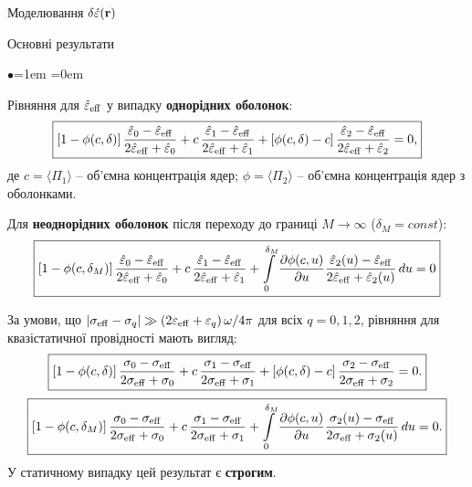 \documentclass[10pt]{beamer}
\begin{document}
\begin{frame}{Моделювання $\delta\hat{\varepsilon}({\bf r})$}
\end{frame}

\begin{frame}{Основні результати}
\footnotesize

\begin{list}{$\bullet$}{\leftmargin=1em \itemindent=0em}
\item
Рівняння для $\hat{\varepsilon}_{\rm eff}$ у випадку \textbf{однорідних оболонок}:
\begin{equation}\label{eq:uniformshell}
\boxed{
\left[1-\phi(c, \delta)\right]\frac{\hat{\varepsilon}_0
-\hat{\varepsilon}_{\rm eff}}{2\hat{\varepsilon}_{\rm
eff}+\hat{\varepsilon}_0} + c\,\frac{\hat{\varepsilon}_1
-\hat{\varepsilon}_{\rm eff}}{2\hat{\varepsilon}_{\rm
eff}+\hat{\varepsilon}_1}
+\left[\phi(c, \delta)-c\right]\frac{\hat{\varepsilon}_2
-\hat{\varepsilon}_{\rm eff}}{2\hat{\varepsilon}_{\rm
eff}+\hat{\varepsilon}_2}=0, 
}
\end{equation}
де $c = \langle \Pi_1 \rangle$ -- об'ємна концентрація ядер; $\phi = \langle \Pi_2 \rangle$ -- об'ємна концентрація ядер з оболонками. 

\item
Для \textbf{неоднорідних оболонок} після переходу до границі $M \to \infty$ ($\delta_M = const$):
\begin{equation}\label{eq:nonuniformshell}
\boxed{
\left[1-\phi(c, \delta_M)\right]\frac{\hat{\varepsilon}_0
-\hat{\varepsilon}_{\rm eff}}{2\hat{\varepsilon} _{\rm
eff}+\hat{\varepsilon}_0}+ c\,\frac{\hat{\varepsilon}_1
-\hat{\varepsilon}_{\rm eff}}{2\hat{\varepsilon}_{\rm
eff}+\hat{\varepsilon}_1}
+\int\limits_0^{\delta_M}\frac{\partial \phi(c,u)}{\partial
u}\frac{\hat{\varepsilon}_2 (u) -\hat{\varepsilon}_{\rm
eff}}{2\hat{\varepsilon}_{\rm eff}+\hat{\varepsilon}_2 (u)}\,du
=0
}
\end{equation}

\item
За умови, що  $|\sigma_{\rm eff}-\sigma_{ q}|  \gg  
\left(2\varepsilon_{\rm eff} +\varepsilon_q \right) \omega/4\pi$ для всіх $q=0,1,2$,  рівняння для квазістатичної провідності мають вигляд:
\begin{equation*}\label{eq:conductivity}
\boxed{
\left[1-\phi(c, \delta)\right]\frac{\sigma_0 -\sigma_{\rm
eff}}{2\sigma_{\rm eff}+\sigma_0} + c\,\frac{\sigma_1 -\sigma_{\rm
eff}}{2\sigma_{\rm eff}+\sigma_1} 
+\left[\phi(c, \delta)-c\right]\frac{\sigma_2 -\sigma_{\rm
eff}}{2\sigma_{\rm eff}+\sigma_2}=0. 
}
\end{equation*}
\begin{equation*}\label{eq:nonuniformconductivity}
\boxed{
\left[1-\phi(c, \delta_M)\right]\frac{\sigma_0 -\sigma_{\rm
eff}}{2\sigma _{\rm eff}+\sigma_0}+ c\,\frac{\sigma_1 -\sigma_{\rm
eff}}{2\sigma_{\rm eff}+\sigma_1} 
+\int\limits_0^{\delta_M}\frac{\partial \phi(c,u)}{\partial
u}\frac{\sigma_2 (u) -\sigma_{\rm eff}}{2\sigma_{\rm eff}+\sigma_2
(u)}\,du =0.
}
\end{equation*}
У статичному випадку цей результат є \textbf{строгим}.


\end{list}
\end{frame}
\end{document}
